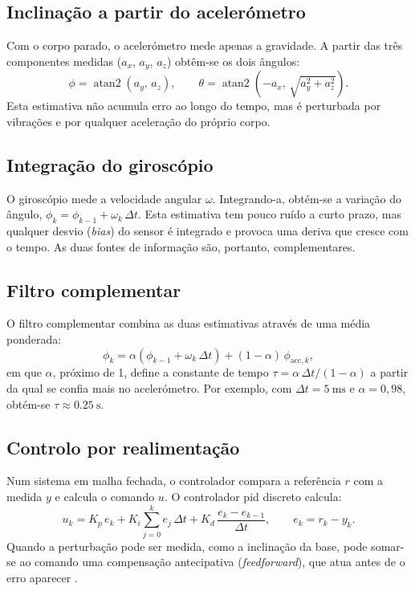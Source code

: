 \subsection{Inclinação a partir do acelerómetro}
Com o corpo parado, o acelerómetro mede apenas a gravidade. A partir das três componentes medidas ($a_x$, $a_y$, $a_z$) obtêm-se os dois ângulos:
\begin{equation}
\phi = \operatorname{atan2}(a_y,\, a_z), \qquad
\theta = \operatorname{atan2}\!\left(-a_x,\, \sqrt{a_y^2 + a_z^2}\right).
\label{eq:acc}
\end{equation}
Esta estimativa não acumula erro ao longo do tempo, mas é perturbada por vibrações e por qualquer aceleração do próprio corpo.

\subsection{Integração do giroscópio}
O giroscópio mede a velocidade angular $\omega$. Integrando-a, obtém-se a variação do ângulo, $\phi_k = \phi_{k-1} + \omega_k\,\Delta t$. Esta estimativa tem pouco ruído a curto prazo, mas qualquer desvio (\textit{bias}) do sensor é integrado e provoca uma deriva que cresce com o tempo. As duas fontes de informação são, portanto, complementares.

\subsection{Filtro complementar}
O filtro complementar combina as duas estimativas através de uma média ponderada:
\begin{equation}
\phi_k = \alpha\left(\phi_{k-1} + \omega_k\,\Delta t\right) + (1-\alpha)\,\phi_{\text{acc},k},
\label{eq:compl}
\end{equation}
em que $\alpha$, próximo de 1, define a constante de tempo $\tau = \alpha\,\Delta t/(1-\alpha)$ a partir da qual se confia mais no acelerómetro. Por exemplo, com $\Delta t = \SI{5}{\milli\second}$ e $\alpha = 0{,}98$, obtém-se $\tau \approx \SI{0.25}{\second}$.

\subsection{Controlo por realimentação}
Num sistema em malha fechada, o controlador compara a referência $r$ com a medida $y$ e calcula o comando $u$. O controlador \gls{pid} discreto calcula:
\begin{equation}
u_k = K_p\, e_k + K_i \sum_{j=0}^{k} e_j\,\Delta t + K_d\,\frac{e_k - e_{k-1}}{\Delta t}, \qquad e_k = r_k - y_k.
\label{eq:pid}
\end{equation}
Quando a perturbação pode ser medida, como a inclinação da base, pode somar-se ao comando uma compensação antecipativa (\textit{feedforward}), que atua antes de o erro aparecer \cite{astrom2021}.

